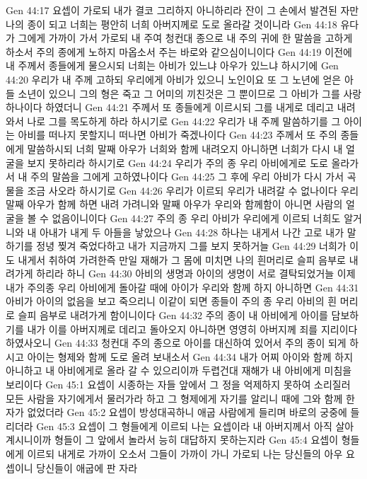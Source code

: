 Gen 44:17  요셉이 가로되 내가 결코 그리하지 아니하리라 잔이 그 손에서 발견된 자만 나의 종이 되고 너희는 평안히 너희 아버지께로 도로 올라갈 것이니라
Gen 44:18  유다가 그에게 가까이 가서 가로되 내 주여 청컨대 종으로 내 주의 귀에 한 말씀을 고하게 하소서 주의 종에게 노하지 마옵소서 주는 바로와 같으심이니이다
Gen 44:19  이전에 내 주께서 종들에게 물으시되 너희는 아비가 있느냐 아우가 있느냐 하시기에
Gen 44:20  우리가 내 주께 고하되 우리에게 아비가 있으니 노인이요 또 그 노년에 얻은 아들 소년이 있으니 그의 형은 죽고 그 어미의 끼친것은 그 뿐이므로 그 아비가 그를 사랑하나이다 하였더니
Gen 44:21  주께서 또 종들에게 이르시되 그를 내게로 데리고 내려와서 나로 그를 목도하게 하라 하시기로
Gen 44:22  우리가 내 주께 말씀하기를 그 아이는 아비를 떠나지 못할지니 떠나면 아비가 죽겠나이다
Gen 44:23  주께서 또 주의 종들에게 말씀하시되 너희 말째 아우가 너희와 함께 내려오지 아니하면 너희가 다시 내 얼굴을 보지 못하리라 하시기로
Gen 44:24  우리가 주의 종 우리 아비에게로 도로 올라가서 내 주의 말씀을 그에게 고하였나이다
Gen 44:25  그 후에 우리 아비가 다시 가서 곡물을 조금 사오라 하시기로
Gen 44:26  우리가 이르되 우리가 내려갈 수 없나이다 우리 말째 아우가 함께 하면 내려 가려니와 말째 아우가 우리와 함께함이 아니면 사람의 얼굴을 볼 수 없음이니이다
Gen 44:27  주의 종 우리 아비가 우리에게 이르되 너희도 알거니와 내 아내가 내게 두 아들을 낳았으나
Gen 44:28  하나는 내게서 나간 고로 내가 말하기를 정녕 찢겨 죽었다하고 내가 지금까지 그를 보지 못하거늘
Gen 44:29  너희가 이도 내게서 취하여 가려한즉 만일 재해가 그 몸에 미치면 나의 흰머리로 슬피 음부로 내려가게 하리라 하니
Gen 44:30  아비의 생명과 아이의 생명이 서로 결탁되었거늘 이제 내가 주의종 우리 아비에게 돌아갈 때에 아이가 우리와 함께 하지 아니하면
Gen 44:31  아비가 아이의 없음을 보고 죽으리니 이같이 되면 종들이 주의 종 우리 아비의 흰 머리로 슬피 음부로 내려가게 함이니이다
Gen 44:32  주의 종이 내 아비에게 아이를 담보하기를 내가 이를 아버지께로 데리고 돌아오지 아니하면 영영히 아버지께 죄를 지리이다 하였사오니
Gen 44:33  청컨대 주의 종으로 아이를 대신하여 있어서 주의 종이 되게 하시고 아이는 형제와 함께 도로 올려 보내소서
Gen 44:34  내가 어찌 아이와 함께 하지 아니하고 내 아비에게로 올라 갈 수 있으리이까 두렵건대 재해가 내 아비에게 미침을 보리이다
Gen 45:1  요셉이 시종하는 자들 앞에서 그 정을 억제하지 못하여 소리질러 모든 사람을 자기에게서 물러가라 하고 그 형제에게 자기를 알리니 때에 그와 함께 한 자가 없었더라
Gen 45:2  요셉이 방성대곡하니 애굽 사람에게 들리며 바로의 궁중에 들리더라
Gen 45:3  요셉이 그 형들에게 이르되 나는 요셉이라 내 아버지께서 아직 살아 계시니이까 형들이 그 앞에서 놀라서 능히 대답하지 못하는지라
Gen 45:4  요셉이 형들에게 이르되 내게로 가까이 오소서 그들이 가까이 가니 가로되 나는 당신들의 아우 요셉이니 당신들이 애굽에 판 자라
